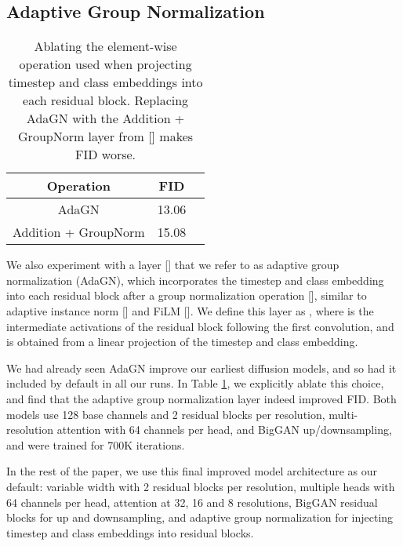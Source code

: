 \documentclass{article}
\newcommand{\shortcite}[1]{[\citenum{#1}]}
\newcommand{\namecite}[1]{\citeauthor{#1} [\citenum{#1}]}
\begin{document}
\subsection{Adaptive Group Normalization}
\label{sec:adapgn}
\begin{table}[t!]
    \begin{center}
    \begin{small}
    \begin{tabular}{ccc}
    \toprule
    Operation & FID \\
    \midrule
    AdaGN & 13.06 \\
    Addition + GroupNorm & 15.08 \\
    \bottomrule
    \end{tabular}
    \end{small}
    \end{center}
    \caption{Ablating the element-wise operation used when projecting timestep and class embeddings into each residual block. Replacing AdaGN with the Addition + GroupNorm layer from \namecite{ddpm} makes FID worse.}
    \label{tab:adagn}
    \vskip -0.2in
\end{table}

We also experiment with a layer \shortcite{improved} that we refer to as adaptive group normalization (AdaGN), which incorporates the timestep and class embedding into each residual block after a group normalization operation \shortcite{groupnorm}, similar to adaptive instance norm \shortcite{stylegan} and FiLM \shortcite{film}. We define this layer as , where  is the intermediate activations of the residual block following the first convolution, and  is obtained from a linear projection of the timestep and class embedding. 

We had already seen AdaGN improve our earliest diffusion models, and so had it included by default in all our runs. In Table \ref{tab:adagn}, we explicitly ablate this choice, and find that the adaptive group normalization layer indeed improved FID. Both models use 128 base channels and 2 residual blocks per resolution, multi-resolution attention with 64 channels per head, and BigGAN up/downsampling, and were trained for 700K iterations.

In the rest of the paper, we use this final improved model architecture as our default: variable width with 2 residual blocks per resolution, multiple heads with 64 channels per head, attention at 32, 16 and 8 resolutions, BigGAN residual blocks for up and downsampling, and adaptive group normalization for injecting timestep and class embeddings into residual blocks.
\end{document}
